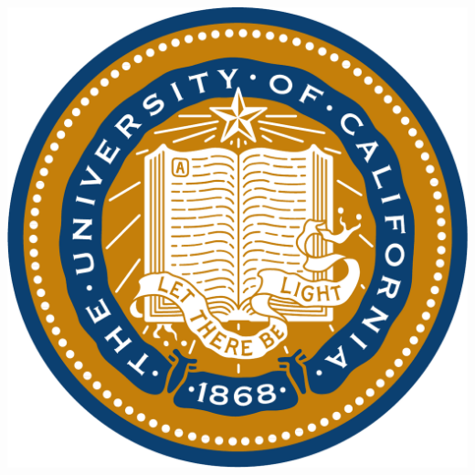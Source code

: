 \documentclass[11pt]{a0poster}
\begin{document}
\begin{minipage}{0.113\linewidth}
\includegraphics[scale=0.6]{ucseal_540_139.pdf}
\end{minipage}

{\color{Blue}\noindent\makebox[\linewidth]{\rule{\paperwidth}{30pt}}}
\end{document}
